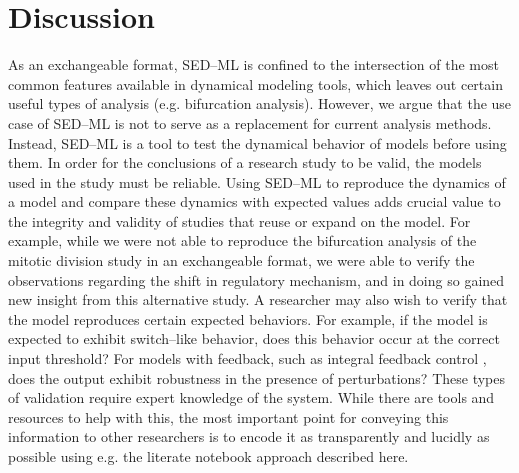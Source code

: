 \documentclass[10pt,letterpaper]{article}
\begin{document}
\section*{Discussion}

As an exchangeable format, SED--ML is confined to the intersection of the most common features available in dynamical modeling tools, which leaves out certain useful types of analysis (e.g. bifurcation analysis). However, we argue that the use case of SED--ML is not to serve as a replacement for current analysis methods. Instead, SED--ML is a tool to test the dynamical behavior of models before using them. In order for the conclusions of a research study to be valid, the models used in the study must be reliable. Using SED--ML to reproduce the dynamics of a model and compare these dynamics with expected values adds crucial value to the integrity and validity of studies that reuse or expand on the model. For example, while we were not able to reproduce the bifurcation analysis of the mitotic division study \cite{calzone2007dynamical} in an exchangeable format, we were able to verify the observations regarding the shift in regulatory mechanism, and in doing so gained new insight from this alternative study.
A researcher may also wish to verify that the model reproduces certain expected behaviors. For example, if the model is expected to exhibit switch--like behavior, does this behavior occur at the correct input threshold? For models with feedback, such as integral feedback control \cite{briat2016antithetic}, does the output exhibit robustness in the presence of perturbations? These types of validation require expert knowledge of the system. While there are tools and resources to help with this, the most important point for conveying this information to other researchers is to encode it as transparently and lucidly as possible using e.g. the literate notebook approach described here.
\end{document}
